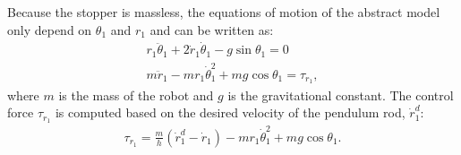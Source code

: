 Because the stopper is massless, the equations of motion
of the abstract model only depend on $\theta_1$ and $r_1$ and can be
written as:
  \begin{eqnarray}
    r_1 \ddot{\theta}_1 + 2\dot{r}_1\dot{\theta}_1 - g \sin \theta_1
    = 0 
    \label{eq:falling_eom1} \\
    m\ddot{r}_1 - m r_1 \dot{\theta}_1^2 + mg \cos\theta_1 = \tau_{r_1},
    \label{eq:falling_eom2}
  \end{eqnarray}
where $m$ is the mass of the robot and $g$ is the gravitational
constant. The control force $\tau_{r_1}$ is computed based on the
desired velocity of the pendulum rod, $\dot{r}_1^d$:
  \begin{equation}
    \begin{aligned}
      \tau_{r_1}= \frac{m}{h}(\dot{r}_1^d - \dot{r}_1) -
      mr_1 \dot{\theta}_1^2 + mg \cos\theta_1.
    \label{eq:falling_velcon}
    \end{aligned}
  \end{equation}

